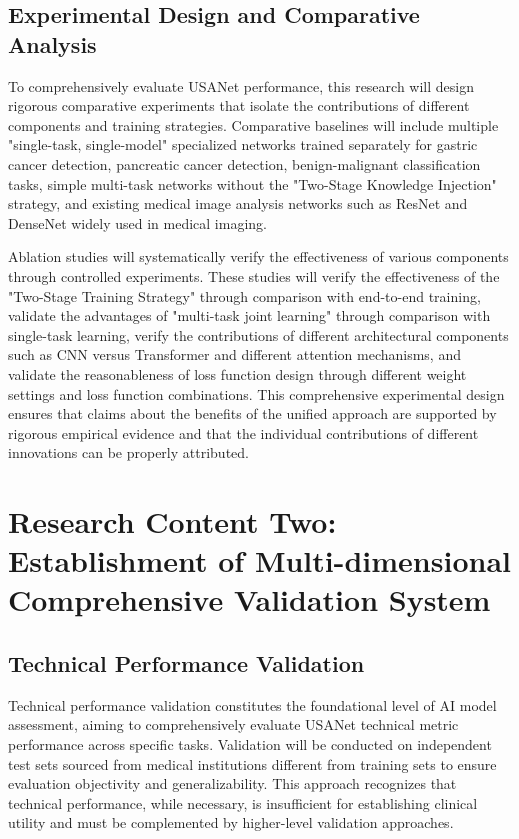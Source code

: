 \subsection{Experimental Design and Comparative Analysis}

To comprehensively evaluate USANet performance, this research will design rigorous comparative experiments that isolate the contributions of different components and training strategies. Comparative baselines will include multiple "single-task, single-model" specialized networks trained separately for gastric cancer detection, pancreatic cancer detection, benign-malignant classification tasks, simple multi-task networks without the "Two-Stage Knowledge Injection" strategy, and existing medical image analysis networks such as ResNet and DenseNet widely used in medical imaging.

Ablation studies will systematically verify the effectiveness of various components through controlled experiments. These studies will verify the effectiveness of the "Two-Stage Training Strategy" through comparison with end-to-end training, validate the advantages of "multi-task joint learning" through comparison with single-task learning, verify the contributions of different architectural components such as CNN versus Transformer and different attention mechanisms, and validate the reasonableness of loss function design through different weight settings and loss function combinations. This comprehensive experimental design ensures that claims about the benefits of the unified approach are supported by rigorous empirical evidence and that the individual contributions of different innovations can be properly attributed.

\section{Research Content Two: Establishment of Multi-dimensional Comprehensive Validation System}

\subsection{Technical Performance Validation}

Technical performance validation constitutes the foundational level of AI model assessment, aiming to comprehensively evaluate USANet technical metric performance across specific tasks. Validation will be conducted on independent test sets sourced from medical institutions different from training sets to ensure evaluation objectivity and generalizability. This approach recognizes that technical performance, while necessary, is insufficient for establishing clinical utility and must be complemented by higher-level validation approaches.

